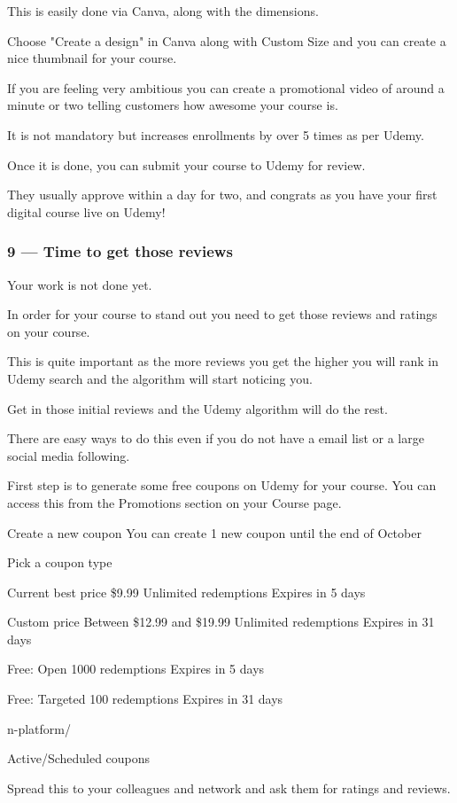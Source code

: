 \documentclass[11pt]{article}
\begin{document}
This is easily done via Canva, along with the dimensions.

Choose "Create a design" in Canva along with Custom Size and you can create a nice thumbnail for your course.

If you are feeling very ambitious you can create a promotional video of around a minute or two telling customers how awesome your course is.

It is not mandatory but increases enrollments by over 5 times as per Udemy.

Once it is done, you can submit your course to Udemy for review.

They usually approve within a day for two, and congrats as you have your first digital course live on Udemy!

\subsubsection*{9 — Time to get those reviews}
Your work is not done yet.

In order for your course to stand out you need to get those reviews and ratings on your course.

This is quite important as the more reviews you get the higher you will rank in Udemy search and the algorithm will start noticing you.

Get in those initial reviews and the Udemy algorithm will do the rest.

There are easy ways to do this even if you do not have a email list or a large social media following.

First step is to generate some free coupons on Udemy for your course. You can access this from the Promotions section on your Course page.

Create a new coupon
You can create 1 new coupon until the end of October

Pick a coupon type

Current best price
\$9.99
Unlimited redemptions
Expires in 5 days

Custom price
Between \$12.99 and \$19.99
Unlimited redemptions
Expires in 31 days

Free: Open
1000 redemptions
Expires in 5 days

Free: Targeted
100 redemptions
Expires in 31 days

n-platform/

Active/Scheduled coupons

Spread this to your colleagues and network and ask them for ratings and reviews.
\end{document}
